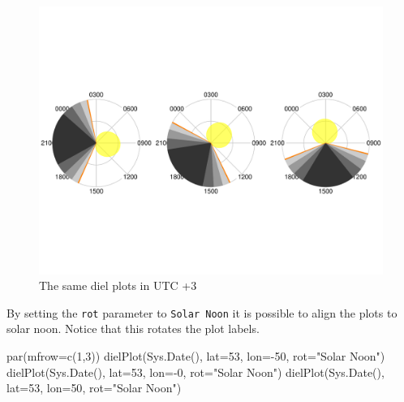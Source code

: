 \documentclass[
]{book}
\newenvironment{Shaded}{\begin{snugshade}}{\end{snugshade}}
\newcommand{\AttributeTok}[1]{\textcolor[rgb]{0.77,0.63,0.00}{#1}}
\newcommand{\DecValTok}[1]{\textcolor[rgb]{0.00,0.00,0.81}{#1}}
\newcommand{\FunctionTok}[1]{\textcolor[rgb]{0.00,0.00,0.00}{#1}}
\newcommand{\NormalTok}[1]{#1}
\newcommand{\SpecialCharTok}[1]{\textcolor[rgb]{0.00,0.00,0.00}{#1}}
\newcommand{\StringTok}[1]{\textcolor[rgb]{0.31,0.60,0.02}{#1}}
\begin{document}
\begin{figure}

{\centering \includegraphics[width=0.9\linewidth]{_main_files/figure-latex/diel-plot-tz-1} 

}

\caption{The same diel plots in UTC +3}\label{fig:diel-plot-tz}
\end{figure}

By setting the \texttt{rot} parameter to \texttt{Solar\ Noon} it is possible to align the plots to solar noon. Notice that this rotates the plot labels.

\begin{Shaded}
\begin{Highlighting}[]
\FunctionTok{par}\NormalTok{(}\AttributeTok{mfrow=}\FunctionTok{c}\NormalTok{(}\DecValTok{1}\NormalTok{,}\DecValTok{3}\NormalTok{))}
\FunctionTok{dielPlot}\NormalTok{(}\FunctionTok{Sys.Date}\NormalTok{(), }\AttributeTok{lat=}\DecValTok{53}\NormalTok{, }\AttributeTok{lon=}\SpecialCharTok{{-}}\DecValTok{50}\NormalTok{, }\AttributeTok{rot=}\StringTok{"Solar Noon"}\NormalTok{)}
\FunctionTok{dielPlot}\NormalTok{(}\FunctionTok{Sys.Date}\NormalTok{(), }\AttributeTok{lat=}\DecValTok{53}\NormalTok{, }\AttributeTok{lon=}\SpecialCharTok{{-}}\DecValTok{0}\NormalTok{, }\AttributeTok{rot=}\StringTok{"Solar Noon"}\NormalTok{)}
\FunctionTok{dielPlot}\NormalTok{(}\FunctionTok{Sys.Date}\NormalTok{(), }\AttributeTok{lat=}\DecValTok{53}\NormalTok{, }\AttributeTok{lon=}\DecValTok{50}\NormalTok{, }\AttributeTok{rot=}\StringTok{"Solar Noon"}\NormalTok{)}
\end{Highlighting}
\end{Shaded}
\end{document}
